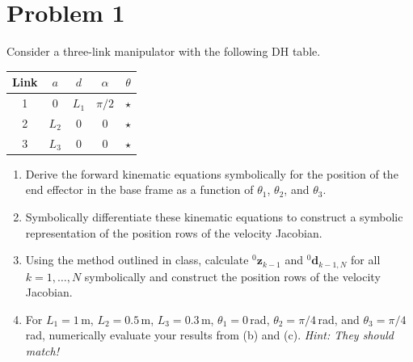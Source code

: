 \documentclass[11pt]{article}
\newcommand{\dvec}{\bm{d}}
\begin{document}
\section*{Problem 1}

\begin{statement}
Consider a three-link manipulator with the following DH table.
\begin{center}
\begin{tabular}{c|cccc}
Link & $a$ & $d$ & $\alpha$ & $\theta$  \\ \hline
1 & $0$ & $L_1$ & $\pi/2$ & $\star$ \\
2 & $L_2$ & $0$ & $0$ & $\star$ \\
3 & $L_3$ & $0$ & $0$ & $\star$
\end{tabular}
\end{center}
\begin{enumerate}[label=(\alph*), nosep]
\item Derive the forward kinematic equations symbolically for the position of the end effector in the base frame as a function of $\theta_1$, $\theta_2$, and $\theta_3$.
\item Symbolically differentiate these kinematic equations to construct a symbolic representation of the position rows of the velocity Jacobian.
\item Using the method outlined in class, calculate ${}^0\bm{z}_{k-1}$ and ${}^0\dvec_{k-1,N}$ for all $k=1,\ldots,N$ symbolically and construct the position rows of the velocity Jacobian.
\item For $L_1=1$\,m, $L_2=0.5$\,m, $L_3=0.3$\,m, $\theta_1=0$\,rad, $\theta_2=\pi/4$\,rad, and $\theta_3=\pi/4$\,rad, numerically evaluate your results from (b) and (c). \emph{Hint: They should match!}
\end{enumerate}
\end{statement}
\end{document}
